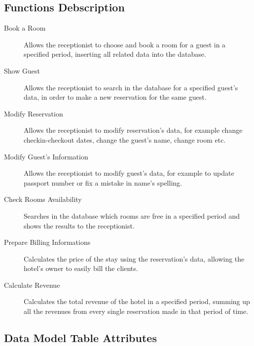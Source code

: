 

\subsection{Functions Debscription}

\begin{description}

  \item[Book a Room] Allows the receptionist to choose and book a room for a guest in a specified period, inserting all related data into the database.
  
  \item[Show Guest] Allows the receptionist to search in the database for a specified guest's data, in order to make a new reservation for the same guest.
    
  \item[Modify Reservation] Allows the receptionist to modify reservation's data, for example change checkin-checkout dates, change the guest's name, change room etc.

  \item[Modify Guest's Information] Allows the receptionist to modify guest's data, for example to update passport number or fix a mistake in name's spelling.

  \item[Check Rooms Availability] Searches in the database which rooms are free in a specified period and shows the results to the receptionist.

  \item[Prepare Billing Informations] Calculates the price of the stay using the reservation's data, allowing the hotel's owner to easily bill the clients.

  \item[Calculate Revenue] Calculates the total revenue of the hotel in a specified period, summing up all the revenues from every single reservation made in that period of time.

\end{description}

\subsection{Data Model Table Attributes}

